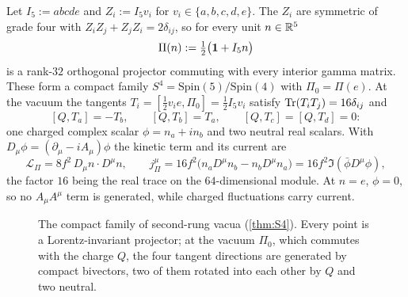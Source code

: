 \begin{theorem}
\label{thm:S4}
Let $I_5:=abcde$ and $Z_i:=I_5v_i$ for $v_i\in\{a,b,c,d,e\}$. The $Z_i$ are symmetric of grade four with $Z_iZ_j+Z_jZ_i=2\delta_{ij}$, so for every unit $n\in\mathbb{R}^5$
\[
\Pi(n):=\tfrac12\bigl(\mathbf 1+I_5n\bigr)
\]
is a rank-$32$ orthogonal projector commuting with every interior gamma matrix. These form a compact family $S^4=\mathrm{Spin}(5)/\mathrm{Spin}(4)$ with $\Pi_0=\Pi(e)$.
At the vacuum the tangents $T_i=[\tfrac12v_ie,\Pi_0]=\tfrac12I_5v_i$ satisfy $\operatorname{Tr}(T_iT_j)=16\delta_{ij}$ and
\[
[Q,T_a]=-T_b,\qquad [Q,T_b]=T_a,\qquad [Q,T_c]=[Q,T_d]=0 :
\]
one charged complex scalar $\phi=n_a+in_b$ and two neutral real scalars. With $D_\mu\phi=(\partial_\mu-iA_\mu)\phi$ the kinetic term and its current are
\[
\mathcal L_\Pi=8f^2\,D_\mu n\cdot D^\mu n,\qquad j^\mu_\Pi=16f^2\bigl(n_aD^\mu n_b-n_bD^\mu n_a\bigr)=16f^2\Im(\bar\phi D^\mu\phi),
\]
the factor $16$ being the real trace on the $64$-dimensional module. At $n=e$, $\phi=0$, so no $A_\mu A^\mu$ term is generated, while charged fluctuations carry current.
\end{theorem}

\begin{figure}[t]
\centering
{}
\caption{The compact family of second-rung vacua (\cref{thm:S4}). Every point is a Lorentz-invariant projector; at the vacuum $\Pi_0$, which commutes with the charge $Q$,
the four tangent directions are generated by compact bivectors, two of them rotated into each other by $Q$ and two neutral.}
\label{fig:S4}
\end{figure}

